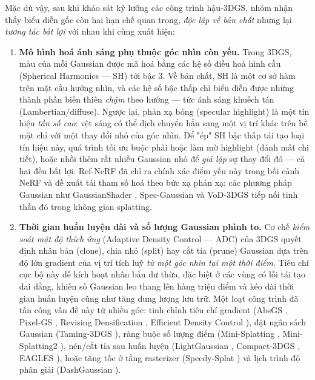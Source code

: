     Mặc dù vậy, sau khi khảo sát kỹ lưỡng các công trình hậu-3DGS, nhóm nhận thấy
    biểu diễn gốc còn hai hạn chế quan trọng, \textit{độc lập về bản chất} nhưng lại
    \textit{tương tác bất lợi} với nhau khi cùng xuất hiện:

    \begin{enumerate}
        \item \textbf{Mô hình hoá ánh sáng phụ thuộc góc nhìn còn yếu.} Trong 3DGS,
        màu của mỗi Gaussian được mã hoá bằng các hệ số điều hoà hình cầu
        (Spherical Harmonics — SH) tới bậc 3. Về bản chất, SH là một cơ sở hàm trên
        mặt cầu hướng nhìn, và các hệ số bậc thấp chỉ biểu diễn được những thành
        phần biến thiên \textit{chậm} theo hướng — tức ánh sáng khuếch tán
        (Lambertian/diffuse). Ngược lại, phản xạ bóng (specular highlight) là một
        tín hiệu \textit{tần số cao}: vệt sáng có thể dịch chuyển hẳn sang một vị
        trí khác trên bề mặt chỉ với một thay đổi nhỏ của góc nhìn. Để "ép" SH bậc
        thấp tái tạo loại tín hiệu này, quá trình tối ưu buộc phải hoặc làm mờ
        highlight (đánh mất chi tiết), hoặc nhồi thêm rất nhiều Gaussian nhỏ để
        \textit{giả lập} sự thay đổi đó — cả hai đều bất lợi. Ref-NeRF \cite{refnerf}
        đã chỉ ra chính xác điểm yếu này trong bối cảnh NeRF và đề xuất tái tham số
        hoá theo bức xạ phản xạ; các phương pháp Gaussian như GaussianShader
        \cite{gaussianshader}, Spec-Gaussian \cite{specgaussian} và VoD-3DGS
        \cite{vod3dgs} tiếp nối tinh thần đó trong không gian splatting.

        \item \textbf{Thời gian huấn luyện dài và số lượng Gaussian phình to.} Cơ
        chế \textit{kiểm soát mật độ thích ứng} (Adaptive Density Control — ADC) của
        3DGS quyết định nhân bản (clone), chia nhỏ (split) hay cắt tỉa (prune)
        Gaussian dựa trên độ lớn gradient của vị trí tích luỹ \textit{từ một góc
        nhìn tại một thời điểm}. Tiêu chí cục bộ này dễ kích hoạt nhân bản dư thừa,
        đặc biệt ở các vùng có lỗi tái tạo dai dẳng, khiến số Gaussian leo thang lên
        hàng triệu điểm và kéo dài thời gian huấn luyện cũng như tăng dung lượng lưu
        trữ. Một loạt công trình đã tấn công vấn đề này từ nhiều góc: tinh chỉnh
        tiêu chí gradient (AbsGS \cite{absgs}, Pixel-GS \cite{pixelgs}, Revising
        Densification \cite{revisedens}, Efficient Density Control \cite{effdensity}),
        đặt ngân sách Gaussian (Taming-3DGS \cite{taming3dgs}), ràng buộc số lượng
        điểm (Mini-Splatting \cite{minisplatting}, Mini-Splatting2
        \cite{minisplatting2}), nén/cắt tỉa sau huấn luyện (LightGaussian
        \cite{lightgaussian}, Compact-3DGS \cite{compact3d}, EAGLES \cite{eagles}),
        hoặc tăng tốc ở tầng rasterizer (Speedy-Splat \cite{speedysplat}) và lịch
        trình độ phân giải (DashGaussian \cite{dashgs}).
    \end{enumerate}

